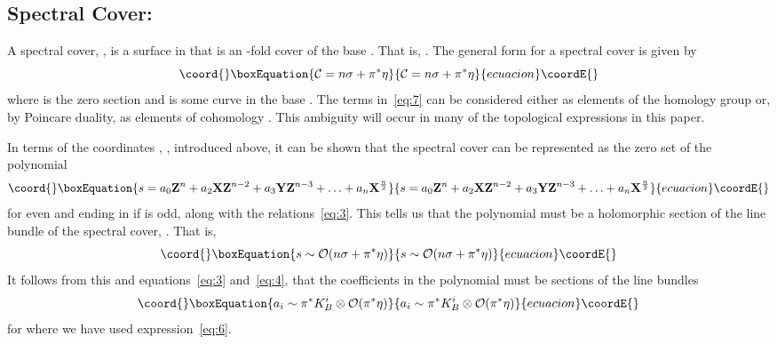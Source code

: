 \documentclass[a4paper,12pt]{article}
\numberwithin{equation}{section}
\providecommand{\bX}{{\mathbf X}}
\providecommand{\bY}{{\mathbf Y}}
\providecommand{\bZ}{{\mathbf Z}}
\def\cC{{\mathcal C}}
\def\cO{{\mathcal O}}
\theoremstyle{plain}
\begin{document}
\subsection*{Spectral Cover:}

A spectral cover, \myHighlight{$\cC$}\coordHE{}, is a surface in \coordHE{} that is an \coordHE{}-fold cover of the
base \coordHE{}. That is, \myHighlight{$\pi_{\cC}: \cC\to B$}\coordHE{}. The general form for a
spectral cover is given by
\begin{equation}\coord{}\boxEquation{
\cC=n\sigma + \pi^*\eta
\label{eq:7}
}{
\cC=n\sigma + \pi^*\eta
}{ecuacion}\coordE{}\end{equation}
where \myHighlight{$\sigma$}\coordHE{} is the zero section and \myHighlight{$\eta$}\coordHE{} is some curve in the base \coordHE{}.
The terms in~\eqref{eq:7} can be considered either as
elements of the homology group \coordHE{} or, by
Poincare duality, as elements of cohomology \coordHE{}. 
This ambiguity
will occur in many of the topological expressions in this paper.

In terms of the coordinates \myHighlight{$\bX$}\coordHE{}, \myHighlight{$\bY$}\coordHE{}, \myHighlight{$\bZ$}\coordHE{} introduced above, 
it can be shown that
the spectral cover can be represented as the zero set of the polynomial
\begin{equation}\coord{}\boxEquation{
s=a_{0}\bZ^{n} + a_{2}\bX\bZ^{n-2} + a_{3}\bY\bZ^{n-3} + \ldots +
a_{n}\bX^{\frac{n}{2}} 
\label{eq:8}
}{
s=a_{0}\bZ^{n} + a_{2}\bX\bZ^{n-2} + a_{3}\bY\bZ^{n-3} + \ldots +
a_{n}\bX^{\frac{n}{2}} 
}{ecuacion}\coordE{}\end{equation}
for \coordHE{} even and ending in \myHighlight{$a_{n}\bX^{\frac{n-3}{2}}\bY$}\coordHE{} if \coordHE{} is odd,
along with the relations~\eqref{eq:3}. This tells us that the polynomial
\coordHE{} must be a holomorphic section of the line bundle of the spectral 
cover,
\myHighlight{$\cO(\cC)$}\coordHE{}. That is,
\begin{equation}\coord{}\boxEquation{
s \sim \cO(n\sigma + \pi^{*}\eta)
\label{eq:9}
}{
s \sim \cO(n\sigma + \pi^{*}\eta)
}{ecuacion}\coordE{}\end{equation}
It follows from this and equations~\eqref{eq:3} and~\eqref{eq:4}, that the
coefficients \coordHE{} in the polynomial \coordHE{} must be sections of the line
bundles
\begin{equation}\coord{}\boxEquation{
a_{i} \sim \pi^*K_{B}^{i} \otimes \cO(\pi^{*}\eta)
\label{eq:10}
}{
a_{i} \sim \pi^*K_{B}^{i} \otimes \cO(\pi^{*}\eta)
}{ecuacion}\coordE{}\end{equation}
for \coordHE{} where we have used expression~\eqref{eq:6}.
\end{document}
